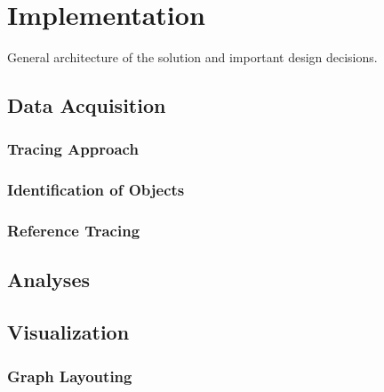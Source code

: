 \chapter{Implementation}
\label{c:implementation}

General architecture of the solution and important design decisions.

\section{Data Acquisition}
\subsection{Tracing Approach}
\subsection{Identification of Objects}
\subsection{Reference Tracing}

\section{Analyses}

\section{Visualization}
\subsection{Graph Layouting}